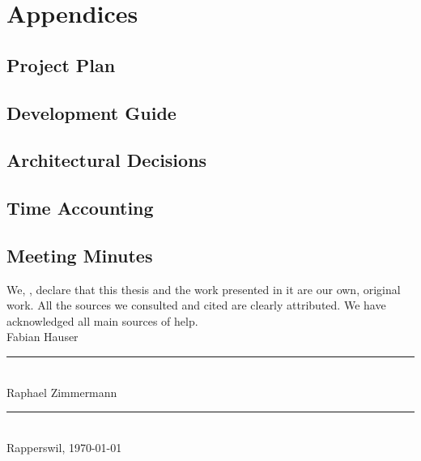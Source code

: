 \chapter{Appendices}
\setcounter{secnumdepth}{3}
\renewcommand{\thechapter}{A}
\section{Project Plan}\label{sec:project-plan}

\section{Development Guide}\label{sec:development-guide}

\section{Architectural Decisions}\label{sec:architectural-decisions}

\section{Time Accounting}\label{sec:time-accounting}

\section{Meeting Minutes}\label{sec:meeting-minutes}







\begin{declaration}
\addchaptertocentry{\authorshipname} %
\noindent We, \authorname, declare that this thesis and the work presented in it are our own, original work.  All the sources we consulted and cited are clearly attributed. We have acknowledged all main sources of help. \\

\noindent Fabian Hauser\\[2em]
\rule[0.5em]{25em}{0.5pt}\\ %
\noindent Raphael Zimmermann\\[2em]
\rule[0.5em]{25em}{0.5pt}\\ %
\noindent Rapperswil, \today
\end{declaration}

\cleardoublepage



  

